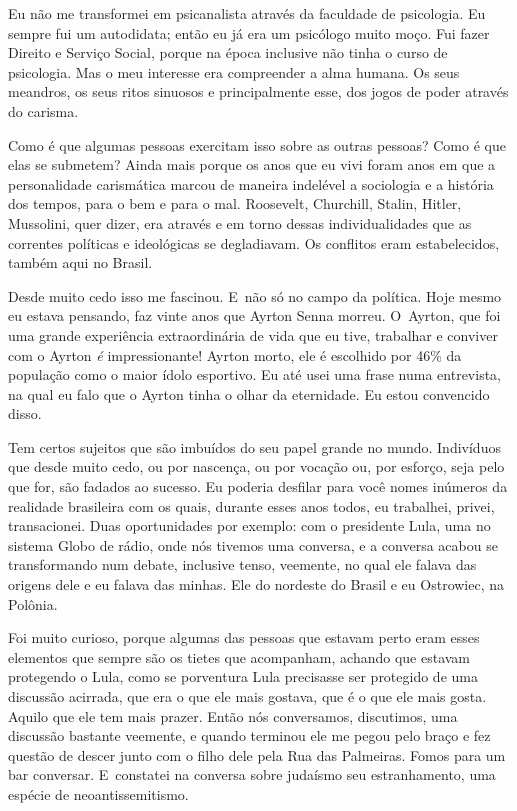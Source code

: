  

Eu não me transformei em psicanalista através da faculdade de
psicologia. Eu sempre fui um autodidata; então eu já era um psicólogo
muito moço. Fui fazer Direito e Serviço Social, porque na época
inclusive não tinha o curso de psicologia. Mas o meu interesse era
compreender a alma humana. Os seus meandros, os seus ritos sinuosos e
principalmente esse, dos jogos de poder através do carisma.

 

Como é que algumas pessoas exercitam isso sobre as outras pessoas? Como
é que elas se submetem? Ainda mais porque os anos que eu vivi foram
anos em que a personalidade carismática marcou de maneira indelével a
sociologia e a história dos tempos, para o bem e para o mal. Roosevelt,
Churchill, Stalin, Hitler, Mussolini, quer dizer, era através e em torno
dessas individualidades que as correntes políticas e ideológicas se
degladiavam. Os conflitos eram estabelecidos, também aqui no Brasil.

 

Desde muito cedo isso me fascinou. E~não só no campo da política. Hoje
mesmo eu estava pensando, faz vinte anos que Ayrton Senna morreu. O~Ayrton, que foi uma grande experiência extraordinária de vida que eu
tive, trabalhar e conviver com o Ayrton \emph{é} impressionante! Ayrton morto,
ele é escolhido por 46\% da população como o maior ídolo esportivo. Eu
até usei uma frase numa entrevista, na qual eu falo que o Ayrton tinha o
olhar da eternidade. Eu estou convencido disso.

 

Tem certos sujeitos que são imbuídos do seu papel grande no mundo.
Indivíduos que desde muito cedo, ou por nascença, ou por vocação ou, por
esforço, seja pelo que for, são fadados ao sucesso. Eu poderia desfilar para
você nomes inúmeros da realidade brasileira com os quais, durante esses
anos todos, eu trabalhei, privei, transacionei. Duas oportunidades por
exemplo: com o presidente Lula, uma no sistema Globo de rádio, onde nós
tivemos uma conversa, e a conversa acabou se transformando num debate,
inclusive tenso, veemente, no qual ele falava das origens dele e eu
falava das minhas. Ele do nordeste do Brasil e eu Ostrowiec, na Polônia.

 

Foi muito curioso, porque algumas das pessoas que estavam perto eram 
esses elementos que sempre são os tietes
que acompanham, achando que estavam protegendo o Lula, como se
porventura Lula precisasse ser protegido de uma discussão acirrada, que
era o que ele mais gostava, que é o que ele mais gosta. Aquilo que ele
tem mais prazer. Então nós conversamos, discutimos, uma discussão
bastante veemente, e quando terminou ele me pegou pelo braço e fez
questão de descer junto com o filho dele pela Rua das Palmeiras. Fomos
para um bar conversar. E~constatei na conversa sobre judaísmo seu
estranhamento, uma espécie de neoantissemitismo. 


